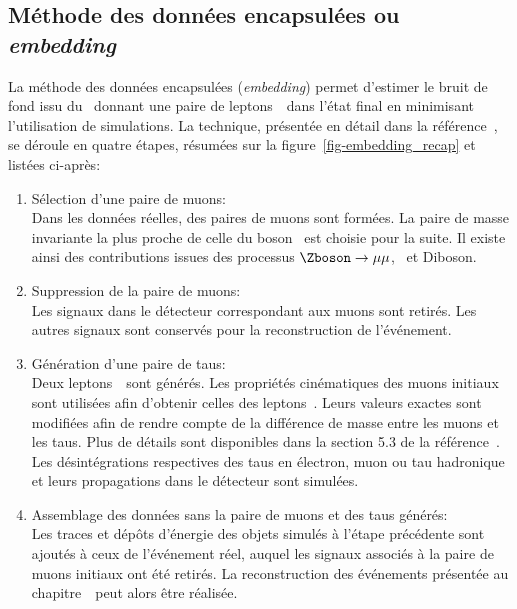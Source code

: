 \subsection{Méthode des données encapsulées ou \emph{embedding}}\label{chapter-HTT_analysis-section-bg_estimation-embedding}
La méthode des données encapsulées (\emph{embedding}) permet d'estimer le bruit de fond issu du \SM\ donnant une paire de leptons~\tau\ dans l'état final en minimisant l'utilisation de simulations.
La technique, présentée en détail dans la référence~\cite{embedding}, se déroule en quatre étapes, résumées sur la figure~\ref{fig-embedding_recap} et listées ci-après:
\begin{enumerate}
\item Sélection d'une paire de muons:\\
Dans les données réelles, des paires de muons sont formées.
La paire de masse invariante la plus proche de celle du boson \Zboson\ est choisie pour la suite.
Il existe ainsi des contributions issues des processus $\Zboson\to\mu\mu$, \ttbar\ et Diboson.
\item Suppression de la paire de muons:\\
Les signaux dans le détecteur correspondant aux muons sont retirés.
Les autres signaux sont conservés pour la reconstruction de l'événement.
\item Génération d'une paire de taus:\\
Deux leptons~\tau\ sont générés.
Les propriétés cinématiques des muons initiaux sont utilisées afin d'obtenir celles des leptons~\tau.
Leurs valeurs exactes sont modifiées afin de rendre compte de la différence de masse entre les muons et les taus.
Plus de détails sont disponibles dans la section 5.3 de la référence~\cite{embedding}.
Les désintégrations respectives des taus en électron, muon ou tau hadronique et leurs propagations dans le détecteur sont simulées.
\item Assemblage des données sans la paire de muons et des taus générés:\\
Les traces et dépôts d'énergie des objets simulés à l'étape précédente sont ajoutés à ceux de l'événement réel, auquel les signaux associés à la paire de muons initiaux ont été retirés.
La reconstruction des événements présentée au chapitre~\ peut alors être réalisée.
\end{enumerate}
